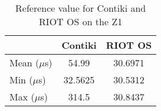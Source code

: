 \begin{table}[!ht]
  \centering
  \begin{tabular}{l|c|c}
       & Contiki & RIOT OS \\ \hline
  Mean ($\mu$s) & 54.99   & 30.6971 \\
  Min  ($\mu$s) & 32.5625 & 30.5312 \\
  Max  ($\mu$s) & 314.5   & 30.8437
  \end{tabular}
  \caption{Reference value for Contiki and RIOT OS on the Z1}
  \label{tab:reference-value-z1}
  \end{table}